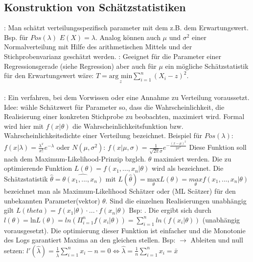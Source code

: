 \subsection{Konstruktion von Schätzstatistiken}
: Man schätzt verteilungsspezifisch parameter mit dem z.B. dem Erwartungswert. Bsp. für $Pos(\lambda)$
$E(X) = \lambda$. Analog können auch $\mu$ und $\sigma^2$ einer Normalverteilung mit Hilfe des arithmetischen Mittels und der Stichprobenvarianz geschätzt werden.
: Geeignet für die Parameter einer Regressionsgerade (siehe Regression) aber auch für $\mu$ ein mögliche Schätzstatistik
für den Erwartungswert wäre: $T = \underset{z}{\text{arg min}}\sum_{i=1}^{n}(X_i - z)^2$.\\\\
: Ein verfahren, bei dem Vorwissen oder eine Annahme zu Verteilung voraussetzt. 
Idee: wähle Schätzwert für Parameter so, dass die Wahrscheinlichkeit, die Realisierung einer konkreten Stichprobe zu beobachten, maximiert wird.
Formal wird hier mit $f(x|\theta)$ die Wahrscheinlichkeitsfunktion bzw. Wahrscheinlichkeitsdichte einer Verteilung bezeichnet. 
Beispiel für $Pos(\lambda)$: $f(x|\lambda) = \frac{\lambda^x}{x!}e^{-\lambda}$ oder $N(\mu, \sigma^2)$: $f(x|\mu, \sigma) = \frac{1}{\sqrt{2\pi}\sigma}e^{-\frac{(x-\mu)^2}{2\sigma^2}}$
Diese Funktion soll nach dem Maximum-Likelihood-Prinzip bzglch. $\theta$ maximiert werden. 
Die zu optimierende Funktion $L(\theta) = f(x_1, ..., x_n|\theta)$ wird als  bezeichnet.
Die Schätzstatistik $\hat{\theta} = \hat{\theta(x_1, ..., x_n)}$ mit 
$L(\hat{\theta}) = \underset{\theta}{\text{max}}L(\theta) = \underset{\theta}{max}f(x_1, ..., x_n|\theta)$ bezeichnet man als Maximum-Likelihood Schätzer oder (ML Scätzer) für den unbekannten Parameter(vektor) $\theta$.
Sind die einzelnen Realisierungen unabhängig gilt $L(theta) = f(x_1|\theta) \cdot ... \cdot f(x_n|\theta)$
Bsp: . Die  ergibt sich durch $l(\theta) = \text{ln}L(\theta) = ln(\Pi_{i=1}^nf(x_i|\theta)) = \sum_{i=1}^nln(f(x_i|\theta))$ (unabhängig vorausgesetzt). Die optimierung dieser Funktion ist einfacher und die Monotonie des Logs garantiert Maxima an den gleichen stellen.
Bsp:  $\rightarrow$ 
Ableiten und null setzen: $l'(\hat{\lambda}) = \frac{1}{\hat{\lambda}}\sum_{i=1}^{n}x_i - n = 0 \Leftrightarrow \hat{\lambda}=\frac{1}{n}\sum_{i=1}^{n}x_i=\bar{x}$

